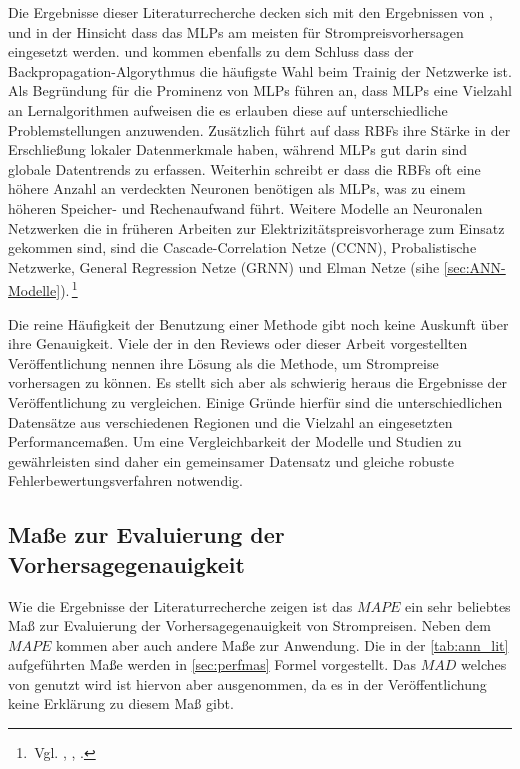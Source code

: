 Die Ergebnisse dieser Literaturrecherche decken sich mit den Ergebnissen von \citet{Aggarwal2009}, \citet{Weron2014} und \citet{Panapakidis2016} in der Hinsicht dass das MLPs am meisten für Strompreisvorhersagen eingesetzt werden. \citet{Aggarwal2009} und \citet{Weron2014} kommen ebenfalls zu dem Schluss dass der Backpropagation-Algorythmus die häufigste Wahl beim Trainig der Netzwerke ist. Als Begründung für die Prominenz von MLPs führen \citet{Panapakidis2016} an, dass MLPs eine Vielzahl an Lernalgorithmen aufweisen die es erlauben diese auf unterschiedliche Problemstellungen anzuwenden. Zusätzlich führt \citet{Weron2014} auf dass RBFs ihre Stärke in der Erschließung lokaler Datenmerkmale haben, während MLPs gut darin sind globale Datentrends zu erfassen. Weiterhin schreibt er dass die RBFs oft eine höhere Anzahl an verdeckten Neuronen benötigen als MLPs, was zu einem höheren Speicher- und Rechenaufwand führt. 
Weitere Modelle an Neuronalen Netzwerken die in früheren Arbeiten zur Elektrizitätspreisvorherage zum Einsatz gekommen sind, sind die Cascade-Correlation Netze (CCNN), Probalistische Netzwerke, General Regression Netze (GRNN) und Elman Netze (sihe \autoref{sec:ANN-Modelle}).\,\footnote{\,Vgl. \citet[757]{Cerjan2013}, \citet[28 ff]{Weron2014}, \citet[134]{Panapakidis2016}.}

Die reine Häufigkeit der Benutzung einer Methode gibt noch keine Auskunft über ihre Genauigkeit. Viele der in den Reviews oder dieser Arbeit vorgestellten Veröffentlichung nennen ihre Lösung als die Methode, um Strompreise vorhersagen zu können. Es stellt sich aber als schwierig heraus die Ergebnisse der Veröffentlichung zu vergleichen. Einige Gründe hierfür sind die unterschiedlichen Datensätze aus verschiedenen Regionen und die Vielzahl an eingesetzten Performancemaßen. Um eine Vergleichbarkeit der Modelle und Studien zu gewährleisten sind daher ein gemeinsamer Datensatz und gleiche robuste Fehlerbewertungsverfahren  notwendig.\, 

\subsection{Maße zur Evaluierung der Vorhersagegenauigkeit}

Wie die Ergebnisse der Literaturrecherche zeigen ist das $MAPE$ ein sehr beliebtes Maß zur Evaluierung der Vorhersagegenauigkeit von Strompreisen. Neben dem $MAPE$ kommen aber auch andere Maße zur Anwendung. Die in der \autoref{tab:ann_lit} aufgeführten Maße werden in \autoref{sec:perfmas} Formel vorgestellt. Das $MAD$ welches von \citet{Keles2016} genutzt wird ist hiervon aber ausgenommen, da es in der Veröffentlichung keine Erklärung zu diesem Maß gibt.

